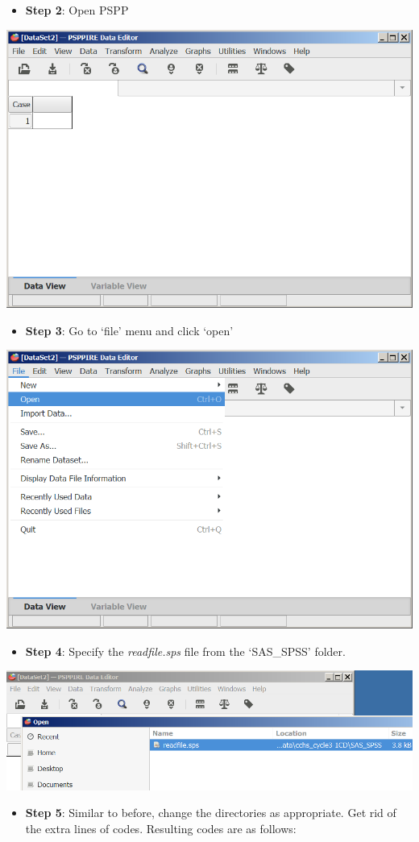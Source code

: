 \documentclass[
]{book}
\providecommand{\tightlist}{%
  \setlength{\itemsep}{0pt}\setlength{\parskip}{0pt}}
\begin{document}
\begin{itemize}
\tightlist
\item
  \textbf{Step 2}: Open PSPP
\end{itemize}

\includegraphics[width=0.65\linewidth]{images/abacus31}

\begin{itemize}
\tightlist
\item
  \textbf{Step 3}: Go to `file' menu and click `open'
\end{itemize}

\includegraphics[width=0.65\linewidth]{images/abacus32}

\begin{itemize}
\tightlist
\item
  \textbf{Step 4}: Specify the \emph{readfile.sps} file from the `SAS\_SPSS' folder.
\end{itemize}

\includegraphics[width=0.65\linewidth]{images/abacus33}

\begin{itemize}
\tightlist
\item
  \textbf{Step 5}: Similar to before, change the directories as appropriate. Get rid of the extra lines of codes. Resulting codes are as follows:
\end{itemize}
\end{document}
